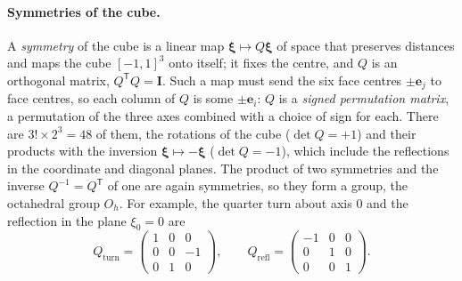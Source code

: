 \documentclass[11pt,a4paper]{article}
\newcommand{\bI}{\mathbf{I}}
\newcommand{\bxi}{\boldsymbol{\xi}}
\begin{document}
\paragraph{Symmetries of the cube.} A \emph{symmetry} of the cube is a linear map $\bxi\mapsto Q\bxi$ of
space that preserves distances and maps the cube $[-1,1]^3$ onto itself; it fixes the centre, and $Q$ is an
orthogonal matrix, $Q^{\mathsf T}Q=\bI$. Such a map must send the six face centres $\pm\mathbf e_j$ to face
centres, so each column of $Q$ is some $\pm\mathbf e_i$: $Q$ is a \emph{signed permutation matrix}, a
permutation of the three axes combined with a choice of sign for each. There are $3!\times2^3=48$ of them,
the rotations of the cube ($\det Q=+1$) and their products with the inversion $\bxi\mapsto-\bxi$
($\det Q=-1$), which include the reflections in the coordinate and diagonal planes. The product of two
symmetries and the inverse $Q^{-1}=Q^{\mathsf T}$ of one are again symmetries, so they form a group, the
octahedral group $O_h$. For example, the quarter turn about axis $0$ and the reflection in the plane
$\xi_0=0$ are
\begin{equation}\label{eq:qexample}
  Q_{\mathrm{turn}}=\begin{pmatrix}1&0&0\\0&0&-1\\0&1&0\end{pmatrix},\qquad
  Q_{\mathrm{refl}}=\begin{pmatrix}-1&0&0\\0&1&0\\0&0&1\end{pmatrix}.
\end{equation}
\end{document}
